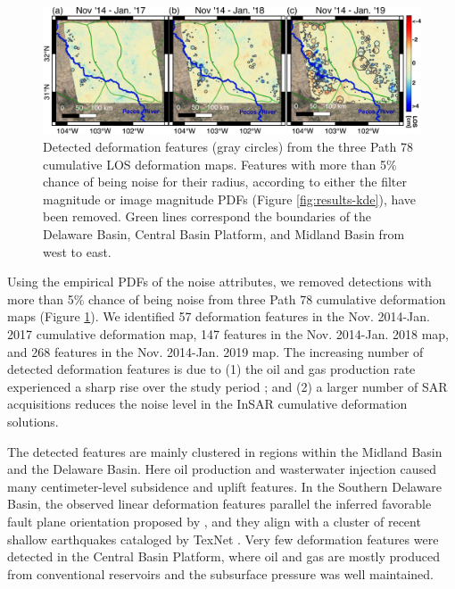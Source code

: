 \begin{figure}	[h]
	\centering 
	\includegraphics[width=0.98\linewidth]{figures/chapter6-blobs/figure_results_blobs_path78.pdf}
	\caption[Detected deformation features for Path 78]{
		Detected deformation features (gray circles) from the three Path 78 cumulative LOS deformation maps. Features with more than 5\% chance of being noise for their radius, according to either the filter magnitude or image magnitude PDFs (Figure \ref{fig:results-kde}), have been removed. Green lines correspond the boundaries of the Delaware Basin, Central Basin Platform, and Midland Basin from west to east.
	}
	\label{fig:results-detections}
\end{figure}


Using the empirical PDFs of the noise attributes, we removed detections with more than 5\% chance of being noise from three Path 78 cumulative deformation maps (Figure \ref{fig:results-detections}). We identified 57 deformation features in the Nov. 2014-Jan. 2017 cumulative deformation map, 147 features in the Nov. 2014-Jan. 2018 map, and 268 features in the Nov. 2014-Jan. 2019 map. The increasing number of detected deformation features is due to (1) the oil and gas production rate experienced a sharp rise over the study period \citep{Staniewicz2020InsarRevealsComplex}; and (2) a larger number of SAR acquisitions reduces the noise level in the InSAR cumulative deformation solutions.



The detected features are mainly clustered in regions within the Midland Basin and the Delaware Basin. Here oil production and wasterwater injection caused many centimeter-level subsidence and uplift features. In the Southern Delaware Basin, the observed linear deformation features parallel the inferred favorable fault plane orientation proposed by \citep{LundSnee2018StateStressPermian}, and they align with a cluster of recent shallow earthquakes cataloged by TexNet \citep{Savvaidis2019TexnetStatewideSeismological}. Very few deformation features were detected in the Central Basin Platform, where oil and gas are mostly produced from conventional reservoirs and the subsurface pressure was well maintained.


